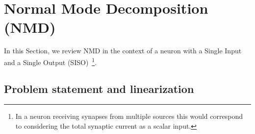 \documentclass[%
 reprint,
 amsmath,amssymb,
 aps,
]{revtex4-2}
\begin{document}

\section{Normal Mode Decomposition (NMD)}\label{sec:DMD}
In this Section, we review NMD \citep{Landau1976Mechanics} in the context of a neuron with a Single Input and a Single Output (SISO)~\footnote{In a neuron receiving synapses from multiple sources this would correspond to considering the total synaptic current as a scalar input.}. 

\subsection{Problem statement and linearization}
\end{document}
